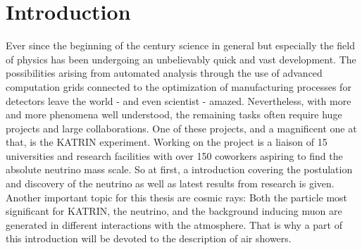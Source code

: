 
\chapter{Introduction}
\label{ch:Introduction}
	Ever since the beginning of the  century science in general but especially the field of physics has been undergoing an unbelievably quick and vast development. The possibilities arising from automated analysis through the use of advanced computation grids connected to the optimization of manufacturing processes for detectors leave the world - and even scientist - amazed. Nevertheless, with more and more phenomena well understood, the remaining tasks often require huge projects and large collaborations. One of these projects, and a magnificent one at that, is the KATRIN experiment.
	Working on the project is a liaison of 15 universities and research facilities with over 150 coworkers aspiring to find the absolute neutrino mass scale. So at first, a introduction covering the postulation and discovery of the neutrino as well as latest results from research is given.
	\\
	Another important topic for this thesis are cosmic rays: Both the particle most significant for KATRIN, the neutrino, and the background inducing muon are generated in different interactions with the atmosphere. That is why a part of this introduction will be devoted to the description of air showers.
	
